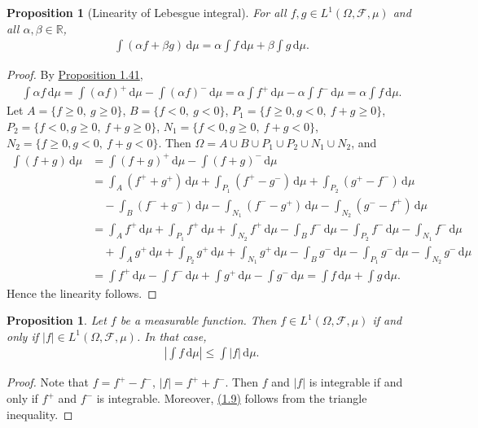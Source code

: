 \documentclass{article}
\numberwithin{equation}{section}
\renewcommand{\d}{\mathrm{d}}
\theoremstyle{plain}
\newtheorem{proposition}[theorem]{Proposition}
\theoremstyle{definition}
\begin{document}
\begin{proposition}[Linearity of Lebesgue integral]\label{prop:1.45} For all $f,g\in L^1(\Omega,\mathscr{F},\mu)$ and all $\alpha,\beta\in\mathbb{R}$,
\begin{align*}
	\int(\alpha f + \beta g)\,\d \mu = \alpha\int f\,\d \mu + \beta\int g\,\d \mu.
\end{align*}
\end{proposition}
\begin{proof}
By \hyperref[prop:1.41]{Proposition 1.41},
\begin{align*}
	\int\alpha f\,\d \mu = \int(\alpha f)^+\,\d \mu - \int(\alpha f)^-\,\d \mu = \alpha\int f^+\,\d \mu - \alpha\int f^-\,\d \mu = \alpha\int f\,\d \mu.
\end{align*}
Let $A=\{f\geq 0,\ g\geq 0\}$, $B=\{f< 0,\ g< 0\}$, $P_1=\{f\geq 0, g<0,\ f+g\geq 0\}$, $P_2=\{f<0, g\geq 0,\ f+g\geq 0\}$, $N_1=\{f< 0, g\geq 0,\ f+g< 0\}$, $N_2=\{f\geq 0, g<0,\ f+g< 0\}$. Then $\Omega=A\cup B\cup P_1\cup P_2\cup N_1\cup N_2$, and
\begin{align*}
	\int (f+g)\,\d \mu &= \int (f+g)^+\,\d \mu - \int (f+g)^-\,\d \mu\\
	&= \int_A (f^+ + g^+)\,\d \mu + \int_{P_1} (f^+ - g^-)\,\d \mu + \int_{P_2} (g^+ - f^-)\,\d \mu \\
	&\quad - \int_B (f^- + g^-)\,\d \mu - \int_{N_1} (f^- - g^+)\,\d \mu - \int_{N_2} (g^- - f^+)\,\d \mu\\
	&= \int_A f^+\,\d \mu + \int_{P_1} f^+\,\d \mu + \int_{N_2} f^+\,\d \mu - \int_B f^-\,\d \mu - \int_{P_2} f^-\,\d \mu - \int_{N_1} f^-\,\d \mu\\
	&\quad + \int_A g^+\,\d \mu + \int_{P_2} g^+\,\d \mu + \int_{N_1} g^+\,\d \mu - \int_B g^-\,\d \mu - \int_{P_1} g^-\,\d \mu - \int_{N_2} g^-\,\d \mu\\
	&= \int f^+\,\d \mu - \int f^-\,\d \mu + \int g^+\,\d \mu - \int g^-\,\d \mu = \int f\,\d \mu + \int g\,\d \mu.
\end{align*}
Hence the linearity follows.
\end{proof}

\begin{proposition}\label{prop:1.46} Let $f$ be a measurable function. Then $f\in L^1(\Omega,\mathscr{F},\mu)$ if and only if $\vert f\vert\in L^1(\Omega,\mathscr{F},\mu)$. In that case,
\begin{align*}
	\left\vert\int f\,\d \mu\right\vert \leq \int\vert f\vert\,\d \mu.\tag{1.9}\label{eq:1.9}
\end{align*}
\end{proposition}
\begin{proof}
Note that $f=f^+-f^-$, $\vert f\vert=f^+ + f^-$. Then $f$ and $\vert f\vert$ is integrable if and only if $f^+$ and $f^-$ is integrable. Moreover, \hyperref[eq:1.9]{(1.9)} follows from the triangle inequality.
\end{proof}
\end{document}
